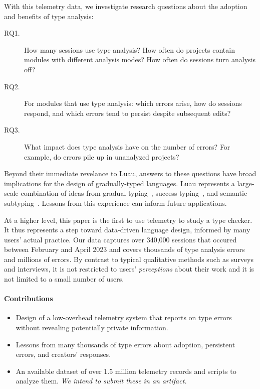 \documentclass[english,submission,cleveref]{programming}
\begin{document}
With this telemetry data, we investigate research questions about
the adoption and benefits of type analysis:
\begin{description}
  \item[RQ1.]
    How many sessions use type analysis?
    How often do projects contain modules with different
    analysis modes?
    How often do sessions turn analysis off?
  \item[RQ2.]
    For modules that use type analysis:
    which errors arise,
    how do sessions respond,
    and which errors tend to persist despite subsequent edits?
  \item[RQ3.]
    What impact does type analysis have on the number of \FS{}
    errors?
    For example, do \FS{} errors pile up in unanalyzed projects?
\end{description}

Beyond their immediate revelance to {Luau},
answers to these questions have broad implications for the design
of gradually-typed languages.
Luau represents a large-scale combination of ideas from
gradual typing~\cite{bat-ecoop-2014,st-sfp-2006,tfffgksst-snapl-2017},
success typing~\cite{lindahl2006practical},
and semantic subtyping~\cite{CF05:GentleIntroduction,Jef22:SemanticSubtyping}.
Lessons from this experience can inform future applications.

At a higher level, this paper is the first to use telemetry 
to study a type checker.
It thus represents a step toward data-driven language design,
informed by many users' actual practice.
Our data captures over 340,000 sessions
that occured between February and April 2023
and covers thousands of type analysis errors
and millions of \FS{} errors.
By contrast to typical qualitative methods such as surveys and interviews, it
is not restricted to users' \emph{perceptions} about their work and it is not
limited to a small number of users.


\paragraph{Contributions}
\begin{itemize}
  \item
    Design of a low-overhead telemetry system
    that reports on type errors without revealing potentially private information.

  \item
    Lessons from many thousands of type errors about
    adoption, persistent errors, and creators' responses.

  \item
    An available dataset of over 1.5 million telemetry records
    and scripts to analyze them.
    \emph{We intend to submit these in an artifact.}

\end{itemize}
\end{document}
